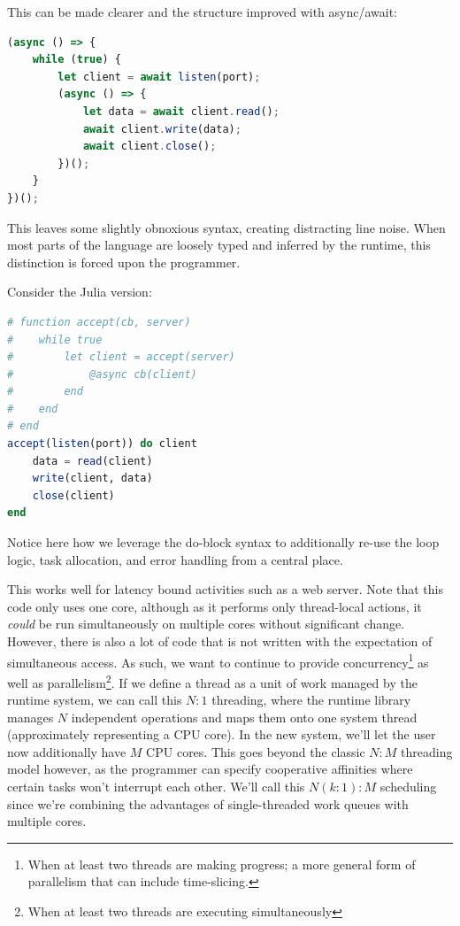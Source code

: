 \documentclass{juliacon}
\begin{document}
This can be made clearer and the structure improved with async/await:
\begin{lstlisting}[language = JavaScript]
(async () => {
    while (true) {
        let client = await listen(port);
        (async () => {
            let data = await client.read();
            await client.write(data);
            await client.close();
        })();
    }
})();
\end{lstlisting}

This leaves some slightly obnoxious syntax, creating distracting line noise. When most parts of the language are loosely typed and inferred by the runtime, this distinction is forced upon the programmer.

Consider the Julia version:

\begin{lstlisting}[language = Julia]
# function accept(cb, server)
#    while true
#        let client = accept(server)
#            @async cb(client)
#        end
#    end
# end
accept(listen(port)) do client
    data = read(client)
    write(client, data)
    close(client)
end
\end{lstlisting}

Notice here how we leverage the do-block syntax to additionally re-use the loop logic, task allocation, and error handling from a central place.

This works well for latency bound activities such as a web server. Note that this code only uses one core, although as it performs only thread-local actions, it \emph{could} be run simultaneously on multiple cores without significant change. However, there is also a lot of code that is not written with the expectation of simultaneous access. As such, we want to continue to provide concurrency\footnote{When at least two threads are making progress; a more general form of parallelism that can include time-slicing.} as well as parallelism\footnote{When at least two threads are executing simultaneously}. If we define a thread as a unit of work managed by the runtime system, we can call this $N \mathbin{:} 1$ threading, where the runtime library manages $N$ independent operations and maps them onto one system thread (approximately representing a CPU core). In the new system, we'll let the user now additionally have $M$ CPU cores. This goes beyond the classic $N \mathbin{:} M$ threading model however, as the programmer can specify cooperative affinities where certain tasks won't interrupt each other. We'll call this $N (k \mathbin{:} 1) \mathbin{:} M$ scheduling since we're combining the advantages of single-threaded work queues with multiple cores.
\end{document}
